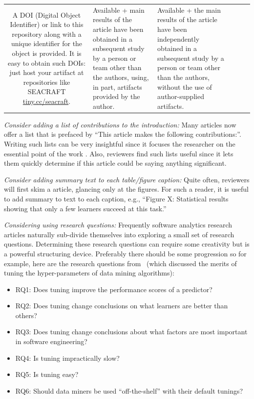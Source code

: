 \documentclass[preprint,10pt]{elsarticle}
\newcommand{\bi}{\begin{itemize}}
\newcommand{\ei}{\end{itemize}}
\begin{document}
\begin{table}[!t]
\begin{tabular}{c|P{0.6in}|P{0.8in}|P{0.9in}|P{0.6in}|P{0.6in}}
A DOI (Digital Object Identifier) or link to this repository along with a unique identifier for the object is provided. It is easy to obtain such DOIs: just host your artifact at repositories like SEACRAFT
\href{https://tiny.cc/seacraft}{tiny.cc/seacraft}. &
Available + main results of the article have been obtained in a subsequent study by a person or team other than the authors, using, in part, artifacts provided by the author.  &
Available + the main results of the article have been independently obtained in a subsequent study by a person or team other than the authors, without the use of author-supplied artifacts. \\ 
\end{tabular}
\end{table}


{\em Consider adding a list of contributions to the introduction:}  Many articles now offer a list that is prefaced by ``This article makes the following contributions:''.  Writing such lists can be very insightful since it focuses the researcher on the essential point of the work \cite{Shaw03}. Also, reviewers find such lists useful since it lets them quickly determine if this article could be saying anything significant.

{\em Consider adding summary text to each table/figure caption:} Quite often, reviewers will first skim  a article, glancing only at the figures. For such a reader, it is useful to add summary to text to each caption, e.g., ``Figure X: Statistical results showing that only a few learners succeed at this task.'' 

{\em Considering using research questions:} Frequently software analytics research articles naturally sub-divide themselves into exploring a small set of research questions. Determining these research questions can require some creativity but is a powerful structuring device. Preferably there should be some progression so for example, here are the research questions from~\cite{fu2016} (which discussed the merits of tuning the hyper-parameters of data mining algorithms):

\bi
\item RQ1: Does tuning improve the performance scores of a predictor? 
\item RQ2: Does tuning change conclusions on what learners are better than others? 
\item RQ3: Does tuning change conclusions about what factors are most important in software engineering? 
\item RQ4: Is tuning impractically slow? 
\item RQ5:
Is tuning easy?
\item RQ6: Should data miners be used ``off-the-shelf'' with their default tunings? 
\ei
\end{document}
